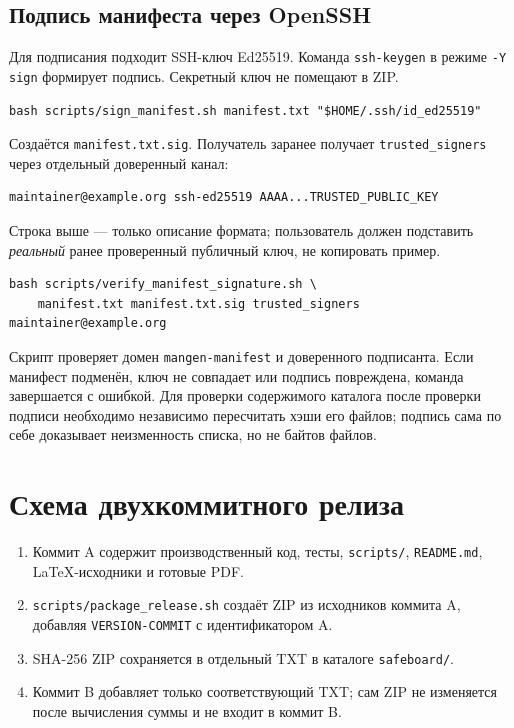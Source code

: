\documentclass[12pt,a4paper]{article}
\begin{document}
\subsection{Подпись манифеста через OpenSSH}

Для подписания подходит SSH-ключ Ed25519. Команда
\texttt{ssh-keygen} в режиме \texttt{-Y sign} формирует подпись.
Секретный ключ не помещают в ZIP.

\begin{lstlisting}
bash scripts/sign_manifest.sh manifest.txt "$HOME/.ssh/id_ed25519"
\end{lstlisting}

Создаётся \texttt{manifest.txt.sig}. Получатель заранее получает
\texttt{trusted\_signers} через отдельный доверенный канал:

\begin{lstlisting}
maintainer@example.org ssh-ed25519 AAAA...TRUSTED_PUBLIC_KEY
\end{lstlisting}

Строка выше --- только описание формата; пользователь должен подставить
\emph{реальный} ранее проверенный публичный ключ, не копировать пример.

\begin{lstlisting}
bash scripts/verify_manifest_signature.sh \
    manifest.txt manifest.txt.sig trusted_signers maintainer@example.org
\end{lstlisting}

Скрипт проверяет домен \texttt{mangen-manifest} и доверенного
подписанта. Если манифест подменён, ключ не совпадает или подпись повреждена,
команда завершается с ошибкой. Для проверки содержимого каталога после
проверки подписи необходимо независимо пересчитать хэши его файлов;
подпись сама по себе доказывает неизменность списка, но не байтов файлов.

\section{Схема двухкоммитного релиза}

\begin{enumerate}
\item Коммит A содержит производственный код, тесты, \texttt{scripts/},
\texttt{README.md}, LaTeX-исходники и готовые PDF.
\item \texttt{scripts/package\_release.sh} создаёт ZIP из исходников
коммита A, добавляя \texttt{VERSION-COMMIT} с идентификатором A.
\item SHA-256 ZIP сохраняется в отдельный TXT в каталоге
\texttt{safeboard/}.
\item Коммит B добавляет только соответствующий TXT; сам ZIP не изменяется
после вычисления суммы и не входит в коммит B.
\end{enumerate}
\end{document}

